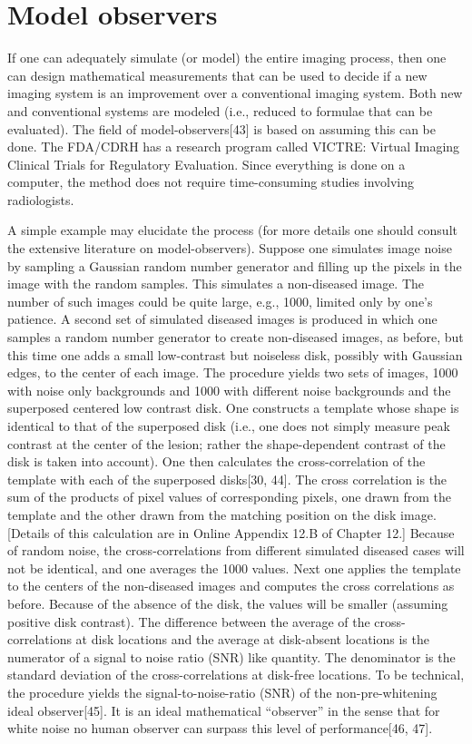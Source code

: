\documentclass[
]{book}
\begin{document}
\hypertarget{model-observers}{%
\section{Model observers}\label{model-observers}}

If one can adequately simulate (or model) the entire imaging process, then one can design mathematical measurements that can be used to decide if a new imaging system is an improvement over a conventional imaging system. Both new and conventional systems are modeled (i.e., reduced to formulae that can be evaluated). The field of model-observers{[}43{]} is based on assuming this can be done. The FDA/CDRH has a research program called VICTRE: Virtual Imaging Clinical Trials for Regulatory Evaluation. Since everything is done on a computer, the method does not require time-consuming studies involving radiologists.

A simple example may elucidate the process (for more details one should consult the extensive literature on model-observers). Suppose one simulates image noise by sampling a Gaussian random number generator and filling up the pixels in the image with the random samples. This simulates a non-diseased image. The number of such images could be quite large, e.g., 1000, limited only by one's patience. A second set of simulated diseased images is produced in which one samples a random number generator to create non-diseased images, as before, but this time one adds a small low-contrast but noiseless disk, possibly with Gaussian edges, to the center of each image. The procedure yields two sets of images, 1000 with noise only backgrounds and 1000 with different noise backgrounds and the superposed centered low contrast disk. One constructs a template whose shape is identical to that of the superposed disk (i.e., one does not simply measure peak contrast at the center of the lesion; rather the shape-dependent contrast of the disk is taken into account). One then calculates the cross-correlation of the template with each of the superposed disks{[}30, 44{]}. The cross correlation is the sum of the products of pixel values of corresponding pixels, one drawn from the template and the other drawn from the matching position on the disk image. {[}Details of this calculation are in Online Appendix 12.B of Chapter 12.{]} Because of random noise, the cross-correlations from different simulated diseased cases will not be identical, and one averages the 1000 values. Next one applies the template to the centers of the non-diseased images and computes the cross correlations as before. Because of the absence of the disk, the values will be smaller (assuming positive disk contrast). The difference between the average of the cross-correlations at disk locations and the average at disk-absent locations is the numerator of a signal to noise ratio (SNR) like quantity. The denominator is the standard deviation of the cross-correlations at disk-free locations. To be technical, the procedure yields the signal-to-noise-ratio (SNR) of the non-pre-whitening ideal observer{[}45{]}. It is an ideal mathematical ``observer'' in the sense that for white noise no human observer can surpass this level of performance{[}46, 47{]}.
\end{document}
